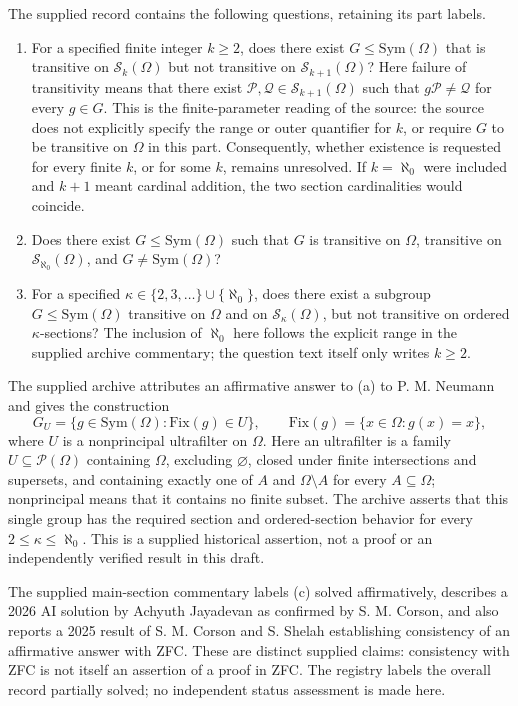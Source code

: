 \documentclass[11pt]{article}
\begin{document}
The supplied record contains the following questions, retaining its part labels.
\begin{enumerate}
\item[(b)] For a specified finite integer \(k\geq2\), does there exist \(G\leq\mathrm{Sym}(\Omega)\) that is transitive on \(\mathcal S_k(\Omega)\) but not transitive on \(\mathcal S_{k+1}(\Omega)\)? Here failure of transitivity means that there exist \(\mathcal P,\mathcal Q\in\mathcal S_{k+1}(\Omega)\) such that \(g\mathcal P\ne\mathcal Q\) for every \(g\in G\). This is the finite-parameter reading of the source: the source does not explicitly specify the range or outer quantifier for \(k\), or require \(G\) to be transitive on \(\Omega\) in this part. Consequently, whether existence is requested for every finite \(k\), or for some \(k\), remains unresolved. If \(k=\aleph_0\) were included and \(k+1\) meant cardinal addition, the two section cardinalities would coincide.
\item[(c)] Does there exist \(G\leq\mathrm{Sym}(\Omega)\) such that \(G\) is transitive on \(\Omega\), transitive on \(\mathcal S_{\aleph_0}(\Omega)\), and \(G\ne\mathrm{Sym}(\Omega)\)?
\item[(a), archived] For a specified \(\kappa\in\{2,3,\ldots\}\cup\{\aleph_0\}\), does there exist a subgroup \(G\leq\mathrm{Sym}(\Omega)\) transitive on \(\Omega\) and on \(\mathcal S_\kappa(\Omega)\), but not transitive on ordered \(\kappa\)-sections? The inclusion of \(\aleph_0\) here follows the explicit range in the supplied archive commentary; the question text itself only writes \(k\geq2\).
\end{enumerate}

The supplied archive attributes an affirmative answer to (a) to P. M. Neumann and gives the construction
\[
G_U=\{g\in\mathrm{Sym}(\Omega):\mathrm{Fix}(g)\in U\},\qquad
\mathrm{Fix}(g)=\{x\in\Omega:g(x)=x\},
\]
where \(U\) is a nonprincipal ultrafilter on \(\Omega\). Here an ultrafilter is a family \(U\subseteq\mathcal P(\Omega)\) containing \(\Omega\), excluding \(\varnothing\), closed under finite intersections and supersets, and containing exactly one of \(A\) and \(\Omega\setminus A\) for every \(A\subseteq\Omega\); nonprincipal means that it contains no finite subset. The archive asserts that this single group has the required section and ordered-section behavior for every \(2\leq\kappa\leq\aleph_0\). This is a supplied historical assertion, not a proof or an independently verified result in this draft.

The supplied main-section commentary labels (c) solved affirmatively, describes a 2026 AI solution by Achyuth Jayadevan as confirmed by S. M. Corson, and also reports a 2025 result of S. M. Corson and S. Shelah establishing consistency of an affirmative answer with ZFC. These are distinct supplied claims: consistency with ZFC is not itself an assertion of a proof in ZFC. The registry labels the overall record partially solved; no independent status assessment is made here.
\end{document}
